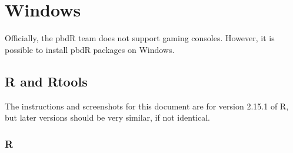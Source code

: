 \section{Windows}

Officially, the pbdR team does not support gaming consoles.  However, it is possible to install pbdR packages on Windows.

\subsection{R and Rtools}

The instructions and screenshots for this document are for version 2.15.1 of R, but later versions should be very similar, if not identical.






\subsubsection{R}


